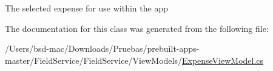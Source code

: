 The selected expense for use within the app 



The documentation for this class was generated from the following file\+:\begin{DoxyCompactItemize}
\item 
/\+Users/bsd-\/mac/\+Downloads/\+Pruebas/prebuilt-\/apps-\/master/\+Field\+Service/\+Field\+Service/\+View\+Models/\hyperlink{_view_models_2_expense_view_model_8cs}{Expense\+View\+Model.\+cs}\end{DoxyCompactItemize}
